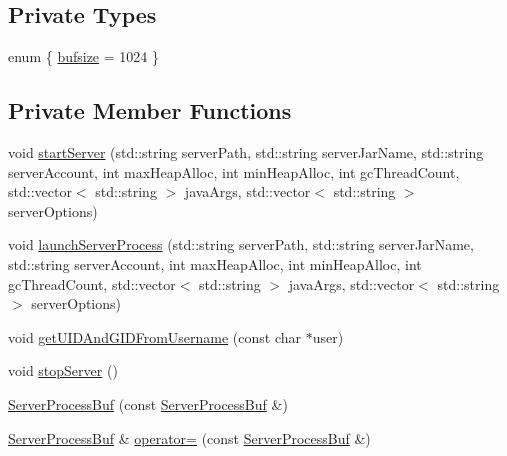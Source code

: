 \subsection*{Private Types}
\begin{DoxyCompactItemize}
\item 
enum \{ \hyperlink{class_minecraft_server_service_1_1_server_process_buf_a087f8bf390860bf7d926a92c809e7c50a11482eda7e1eb693c1ed0f5548a8a2b0}{bufsize} = 1024
 \}
\end{DoxyCompactItemize}
\subsection*{Private Member Functions}
\begin{DoxyCompactItemize}
\item 
void \hyperlink{class_minecraft_server_service_1_1_server_process_buf_a53c4f3c1837c2d1f5ce2a3388f8eaecf}{start\+Server} (std\+::string server\+Path, std\+::string server\+Jar\+Name, std\+::string server\+Account, int max\+Heap\+Alloc, int min\+Heap\+Alloc, int gc\+Thread\+Count, std\+::vector$<$ std\+::string $>$ java\+Args, std\+::vector$<$ std\+::string $>$ server\+Options)
\item 
void \hyperlink{class_minecraft_server_service_1_1_server_process_buf_ac4ad22e1d1978d98b06a999a1100fd27}{launch\+Server\+Process} (std\+::string server\+Path, std\+::string server\+Jar\+Name, std\+::string server\+Account, int max\+Heap\+Alloc, int min\+Heap\+Alloc, int gc\+Thread\+Count, std\+::vector$<$ std\+::string $>$ java\+Args, std\+::vector$<$ std\+::string $>$ server\+Options)
\item 
void \hyperlink{class_minecraft_server_service_1_1_server_process_buf_a50b92162fbeba7f6cba82eab4ecabef0}{get\+U\+I\+D\+And\+G\+I\+D\+From\+Username} (const char $\ast$user)
\item 
void \hyperlink{class_minecraft_server_service_1_1_server_process_buf_af423d2111395bb308c6ac079e299ea40}{stop\+Server} ()
\item 
\hyperlink{class_minecraft_server_service_1_1_server_process_buf_a2e687046e512f7a383ccd546397f1d50}{Server\+Process\+Buf} (const \hyperlink{class_minecraft_server_service_1_1_server_process_buf}{Server\+Process\+Buf} \&)
\item 
\hyperlink{class_minecraft_server_service_1_1_server_process_buf}{Server\+Process\+Buf} \& \hyperlink{class_minecraft_server_service_1_1_server_process_buf_a261abc2b0391f0df602738e37eaaa758}{operator=} (const \hyperlink{class_minecraft_server_service_1_1_server_process_buf}{Server\+Process\+Buf} \&)
\end{DoxyCompactItemize}
